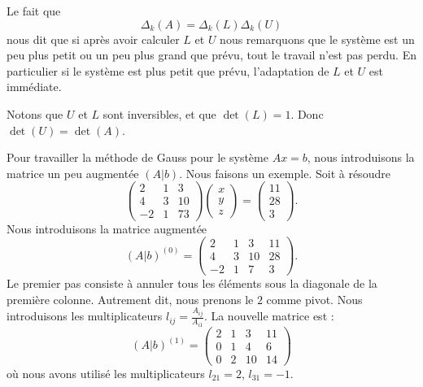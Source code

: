 \begin{normaltext}
    Le fait que
    \begin{equation}
        \Delta_k(A)=\Delta_k(L)\Delta_k(U)
    \end{equation}
    nous dit que si après avoir calculer \( L\) et \( U \) nous remarquons que le système est un peu plus petit ou un peu plus grand que prévu, tout le travail n'est pas perdu. En particulier si le système est plus petit que prévu, l'adaptation de \( L\) et \( U\) est immédiate.
\end{normaltext}

Notons que \( U\) et \( L\) sont inversibles, et que \( \det(L)=1\). Donc \( \det(U)=\det(A)\). 

\begin{example}
    Pour travailler la méthode de Gauss pour le système \( Ax=b\), nous introduisons la matrice un peu augmentée \( (A|b)\). Nous faisons un exemple. Soit à résoudre
    \begin{equation}
        \begin{pmatrix}
             2   &   1    &   3       \\
             4   &   3    &   10     \\ 
             -2   &   1    &   7  3
         \end{pmatrix}
         \begin{pmatrix}
             x   \\ 
             y   \\ 
             z   
         \end{pmatrix}=\begin{pmatrix}
             11   \\ 
             28   \\ 
             3   
         \end{pmatrix}.
    \end{equation}
    Nous introduisons la matrice augmentée
    \begin{equation}
        (A|b)^{(0)}=\begin{pmatrix}
             2   &   1    &   3    &   11    \\
             4   &   3    &   10    &   28    \\ 
             -2   &   1    &   7    &   3
         \end{pmatrix}.
    \end{equation}
    Le premier pas consiste à annuler tous les éléments sous la diagonale de la première colonne. Autrement dit, nous prenons le \( 2\) comme pivot. Nous introduisons les multiplicateurs \( l_{ij}= \frac{ A_{ij} }{ A_{i1} }\). La nouvelle matrice est :
    \begin{equation}
        (A|b)^{(1)}=\begin{pmatrix}
             2   &   1    &   3    &   11    \\
             0   &   1    &   4    &   6    \\ 
             0   &   2    &   10    &   14
         \end{pmatrix}
    \end{equation}
    où nous avons utilisé les multiplicateurs \( l_{21}=2\), \( l_{31}=-1\).


\end{example}
